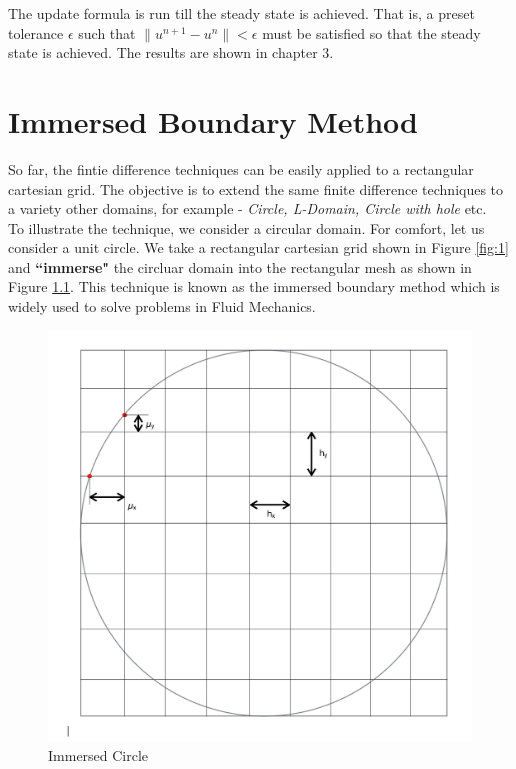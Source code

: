 \documentclass[11pt]{report}
\begin{document}
\noindent
The update formula is run till the steady state is achieved. That is, a preset tolerance $\epsilon$ such that $\lVert u^{n+1} - u^{n} \rVert < \epsilon$ must be satisfied so that the steady state is achieved. The results are shown in chapter 3.

\chapter{Immersed Boundary Method}
So far, the fintie difference techniques can be easily applied to a rectangular cartesian grid. The objective is to extend the same finite difference techniques to a variety other domains, for example - \textit{Circle, L-Domain, Circle with hole} etc. \\

\noindent
To illustrate the technique, we consider a circular domain. For comfort, let us consider a unit circle. We take a rectangular cartesian grid shown in Figure \ref{fig:1} and \textbf{``immerse"} the circluar domain into the rectangular mesh as shown in Figure \ref{fig:2}. This technique is known as the immersed boundary method \cite{pesk} which is widely used to solve problems in Fluid Mechanics.\\

\begin{figure}[h!]
	\centering
	\includegraphics[scale=0.5]{circle-immerse.png}
	\caption{Immersed Circle}
	\label{fig:2}
\end{figure}
\end{document}
